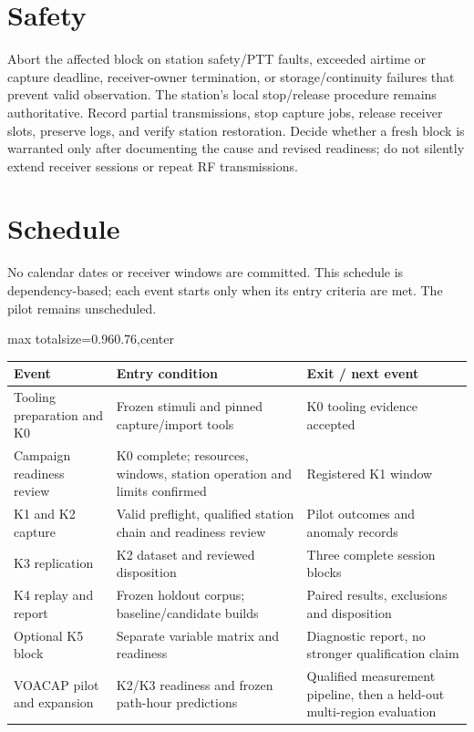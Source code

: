 \documentclass[11pt,a4paper]{article}
\newlength{\tableavail}
\renewcommand{\arraystretch}{1.13}
\begin{document}
\section{Safety}
\label{tp:safety}

Abort the affected block on station safety/PTT faults, exceeded airtime or capture deadline, receiver-owner termination, or storage/continuity failures that prevent valid observation. The station's local stop/release procedure remains authoritative. Record partial transmissions, stop capture jobs, release receiver slots, preserve logs, and verify station restoration. Decide whether a fresh block is warranted only after documenting the cause and revised readiness; do not silently extend receiver sessions or repeat RF transmissions.


\section{Schedule}
\label{tp:schedule}

No calendar dates or receiver windows are committed. This schedule is dependency-based; each event starts only when its entry criteria are met. The pilot remains unscheduled.

\begin{landscape}\thispagestyle{plain}\centering
\setlength{\tabcolsep}{5pt}\renewcommand{\arraystretch}{1.25}
\setlength{\tableavail}{\dimexpr\linewidth-4\tabcolsep\relax}
\begin{adjustbox}{max totalsize={0.96\linewidth}{0.76\textheight},center}
\begin{tabular}{@{}>{\raggedright\arraybackslash}p{0.23\tableavail}>{\raggedright\arraybackslash}p{0.54\tableavail}>{\raggedright\arraybackslash}p{0.23\tableavail}@{}}
\toprule
\textbf{Event} & \textbf{Entry condition} & \textbf{Exit / next event}\\
\midrule
Tooling preparation and K0 & Frozen stimuli and pinned capture/import tools & K0 tooling evidence accepted\\[5pt]
Campaign readiness review & K0 complete; resources, windows, station operation and limits confirmed & Registered K1 window\\[5pt]
K1 and K2 capture & Valid preflight, qualified station chain and readiness review & Pilot outcomes and anomaly records\\[5pt]
K3 replication & K2 dataset and reviewed disposition & Three complete session blocks\\[5pt]
K4 replay and report & Frozen holdout corpus; baseline/candidate builds & Paired results, exclusions and disposition\\[5pt]
Optional K5 block & Separate variable matrix and readiness & Diagnostic report, no stronger qualification claim\\[5pt]
VOACAP pilot and expansion & K2/K3 readiness and frozen path-hour predictions & Qualified measurement pipeline, then a held-out multi-region evaluation\\[5pt]
\bottomrule
\end{tabular}
\end{adjustbox}
\end{landscape}
\end{document}
